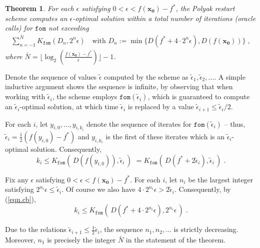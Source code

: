\documentclass[reqno, 11pt]{amsart}
\newtheorem{thm}[prop]{Theorem}
\numberwithin{equation}{section}
\newcommand{\fom}{\mathtt{fom}}
\begin{document}
\begin{thm} \label{thm.ca} 
 For each $ \epsilon $ satisfying $ 0 < \epsilon < f( \mathbf{x_0}) - f^*  $, the Polyak restart scheme computes an $ \epsilon $-optimal solution within a total number of iterations (oracle calls) for $ \fom $ not exceeding  
\begin{align}  \label{eqn.ca} 
   \sum_{n=-1}^{\bar{N}}  K_{\fom}(D_n, 2^n \epsilon ) 
\quad \textrm{with }   D_n :=   \min \{ D(f^* + 4 \cdot 2^n \epsilon), D( f( \mathbf{x_0})) \} \; ,  
\end{align}
where $ \bar{N} = \lfloor \log_2 \left(  \frac{f( \mathbf{x_0}) - f^*}{\epsilon} \right) \rfloor - 1 $.          
\end{thm}
 Denote the sequence of values $ \tilde{\epsilon} $ computed by the scheme as $ \tilde{\epsilon}_1, \tilde{\epsilon}_2, \ldots $. A simple inductive argument shows the sequence is infinite, by observing that when working with $ \tilde{\epsilon}_i $, the scheme employs $ \fom( \tilde{\epsilon}_i ) $, which is guaranteed to compute an $ \tilde{\epsilon}_i $-optimal solution, at which time $ \tilde{\epsilon}_i $ is replaced by a value $ \tilde{\epsilon}_{i+1} \leq \tilde{\epsilon}_i/2 $.

For each $ i $, let $ y_{i,0}, \ldots, y_{i,k_i} $ denote the sequence of iterates for $ \fom( \tilde{\epsilon}_i) $ -- thus, $ \tilde{\epsilon}_i = \frac{1}{2}(f(y_{i,0}) - f^*) $ and $ y_{i,k_i} $ is the first of these iterates which is an $ \tilde{\epsilon}_i $-optimal solution. Consequently, 
\begin{equation}  \label{eqn.cb} 
      k_i \leq K_{\fom} (\, D(f(y_{i,0})), \tilde{\epsilon}_i \, ) \, \, = K_{\fom} (\, D( f^* + 2 \tilde{\epsilon}_i), \tilde{\epsilon}_i \, ) \; . \end{equation}
 

Fix any $ \epsilon $ satisfying $ 0 < \epsilon < f( \mathbf{x_0}) - f^*  $. For each $ i $, let $ n_i $ be the largest integer satisfying $ 2^{n_i} \epsilon \leq \tilde{\epsilon}_i $. Of course we also have $ 4 \cdot 2^{n_i} \epsilon > 2 \tilde{\epsilon}_i $. Consequently, by (\ref{eqn.cb}), 
\begin{equation}  \label{eqn.cc} 
 k_i \leq K_{\fom}( \, D(f^* + 4 \cdot 2^{n_i} \epsilon), 2^{n_i} \epsilon \, ) \; . 
\end{equation}


Due to the relations $ \tilde{\epsilon}_{i+1} \leq \frac{1}{2} \tilde{\epsilon}_i $, the sequence $ n_1, n_2, \ldots $ is strictly decreasing. Moreover, $ n_1 $ is precisely the integer $ \bar{N} $ in the statement of the theorem.   
\end{document}
